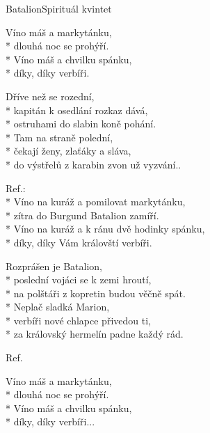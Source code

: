 \documentclass[10.5pt]{book}
\begin{document}
\begin{poem}{Batalion}{Spirituál kvintet}

\settowidth{\versewidth}{Víno na kuráž a k ránu dvě hodinky spánku,}

Víno máš a markytánku,\\*
dlouhá noc se prohýří.\\*
Víno máš a chvilku spánku,\\*
díky, díky verbíři.

Dříve než se rozední,\\*
kapitán k osedlání rozkaz dává,\\*
ostruhami do slabin koně pohání.\\*
Tam na straně polední,\\*
čekají ženy, zlaťáky a sláva,\\*
do výstřelů z karabin zvon už vyzvání..

Ref.:\\*
Víno na kuráž a pomilovat markytánku,\\*
zítra do Burgund Batalion zamíří.\\*
Víno na kuráž a k ránu dvě hodinky spánku,\\*
díky, díky Vám královští verbíři.

Rozprášen je Batalion,\\*
poslední vojáci se k zemi hroutí,\\*
na polštáři z kopretin budou věčně spát.\\*
Neplač sladká Marion,\\*
verbíři nové chlapce přivedou ti,\\*
za královský hermelín padne každý rád.

Ref.

Víno máš a markytánku,\\*
dlouhá noc se prohýří.\\*
Víno máš a chvilku spánku,\\*
díky, díky verbíři...

\end{poem}
\end{document}
